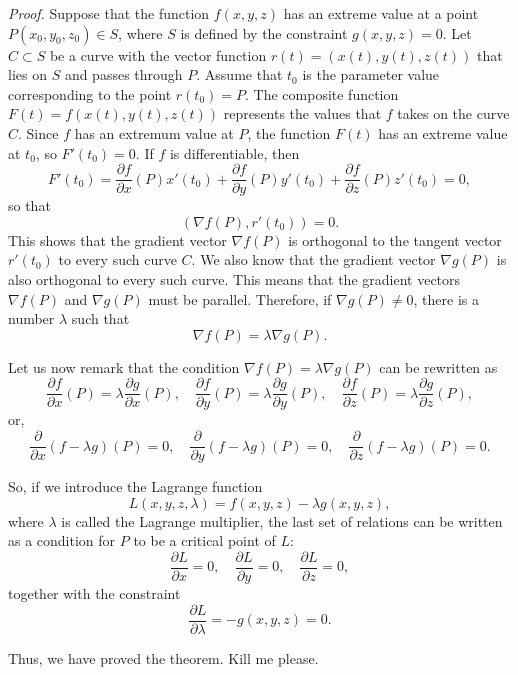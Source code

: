 \documentclass{article}
\begin{document}
\vspace{1em}

\textit{Proof.} Suppose that the function $f(x, y, z)$ has an extreme value at a point $P(x_0, y_0, z_0) \in S$, where $S$ is defined by the constraint $g(x, y, z) = 0$. Let $C \subset S$ be a curve with the vector function $r(t) = (x(t), y(t), z(t))$ that lies on $S$ and passes through $P$. Assume that $t_0$ is the parameter value corresponding to the point $r(t_0) = P$. The composite function $F(t) = f(x(t), y(t), z(t))$ represents the values that $f$ takes on the curve $C$. Since $f$ has an extremum value at $P$, the function $F(t)$ has an extreme value at $t_0$, so $F'(t_0) = 0$. If $f$ is differentiable, then
\[
F'(t_0) = \frac{\partial f}{\partial x}(P)x'(t_0) + \frac{\partial f}{\partial y}(P)y'(t_0) + \frac{\partial f}{\partial z}(P)z'(t_0) = 0,
\]
so that
\[
(\nabla f(P), r'(t_0)) = 0.
\]
This shows that the gradient vector $\nabla f(P)$ is orthogonal to the tangent vector $r'(t_0)$ to every such curve $C$. We also know that the gradient vector $\nabla g(P)$ is also orthogonal to every such curve. This means that the gradient vectors $\nabla f(P)$ and $\nabla g(P)$ must be parallel. Therefore, if $\nabla g(P) \neq 0$, there is a number $\lambda$ such that
\[
\nabla f(P) = \lambda \nabla g(P).
\]

Let us now remark that the condition $\nabla f(P) = \lambda \nabla g(P)$ can be rewritten as
\[
\frac{\partial f}{\partial x}(P) = \lambda \frac{\partial g}{\partial x}(P), \quad \frac{\partial f}{\partial y}(P) = \lambda \frac{\partial g}{\partial y}(P), \quad \frac{\partial f}{\partial z}(P) = \lambda \frac{\partial g}{\partial z}(P),
\]
or,
\[
\frac{\partial}{\partial x}(f - \lambda g)(P) = 0, \quad \frac{\partial}{\partial y}(f - \lambda g)(P) = 0, \quad \frac{\partial}{\partial z}(f - \lambda g)(P) = 0.
\]

So, if we introduce the Lagrange function
\[
L(x, y, z, \lambda) = f(x, y, z) - \lambda g(x, y, z),
\]
where $\lambda$ is called the Lagrange multiplier, the last set of relations can be written as a condition for $P$ to be a critical point of $L$:
\[
\frac{\partial L}{\partial x} = 0, \quad \frac{\partial L}{\partial y} = 0, \quad \frac{\partial L}{\partial z} = 0,
\]
together with the constraint
\[
\frac{\partial L}{\partial \lambda} = -g(x, y, z) = 0.
\]

Thus, we have proved the theorem. Kill me please.
\end{document}
